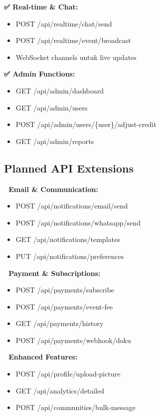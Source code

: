 \documentclass[12pt,a4paper]{article}
\begin{document}
\begin{implemented}
\textbf{✅ Real-time \& Chat:}
\begin{itemize}
    \item POST /api/realtime/chat/send
    \item POST /api/realtime/event/broadcast
    \item WebSocket channels untuk live updates
\end{itemize}

\textbf{✅ Admin Functions:}
\begin{itemize}
    \item GET /api/admin/dashboard
    \item GET /api/admin/users
    \item POST /api/admin/users/\{user\}/adjust-credit
    \item GET /api/admin/reports
\end{itemize}
\end{implemented}

\subsection{Planned API Extensions}

\begin{planned}
\textbf{🔄 Email \& Communication:}
\begin{itemize}
    \item POST /api/notifications/email/send
    \item POST /api/notifications/whatsapp/send
    \item GET /api/notifications/templates
    \item PUT /api/notifications/preferences
\end{itemize}

\textbf{🔄 Payment \& Subscriptions:}
\begin{itemize}
    \item POST /api/payments/subscribe
    \item POST /api/payments/event-fee
    \item GET /api/payments/history
    \item POST /api/payments/webhook/doku
\end{itemize}

\textbf{🔄 Enhanced Features:}
\begin{itemize}
    \item POST /api/profile/upload-picture
    \item GET /api/analytics/detailed
    \item POST /api/communities/bulk-message
\end{itemize}
\end{planned}
\end{document}
